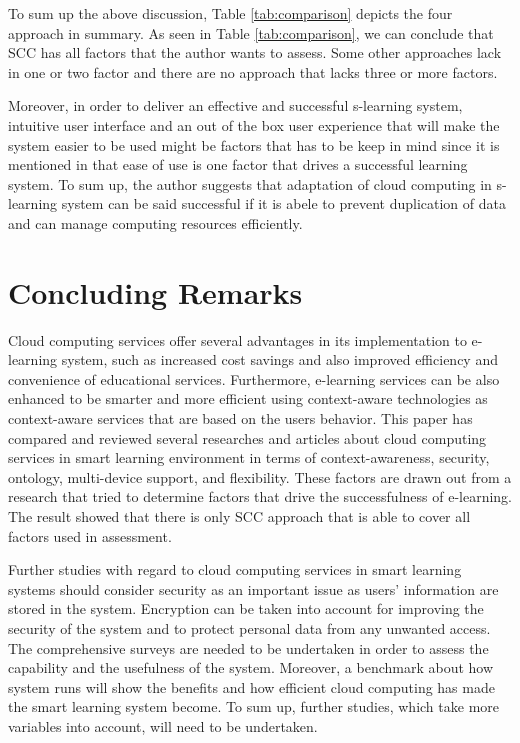 \documentclass[journal]{vgtc}
\begin{document}
To sum up the above discussion, Table \ref{tab:comparison} depicts the four approach in summary. As seen in Table \ref{tab:comparison}, we can conclude that SCC has all factors that the author wants to assess. Some other approaches lack in one or two factor and there are no approach that lacks three or more factors.

Moreover, in order to deliver an effective and successful s-learning system, intuitive user interface and an out of the box user experience that will make the system easier to be used might be factors that has to be keep in mind since it is mentioned in \cite{Sun2008} that ease of use is one factor that drives a successful learning system. To sum up, the author suggests that adaptation of cloud computing in s-learning system can be said successful if it is abele to prevent duplication of data and can manage computing resources efficiently.

\section{Concluding Remarks}
Cloud computing services offer several advantages in its implementation to e-learning system, such as increased cost savings and also improved efficiency and convenience of educational services. Furthermore, e-learning services can be also enhanced to be smarter and more efficient using context-aware technologies as context-aware services that are based on the users behavior. This paper has compared and reviewed several researches and articles about cloud computing services in smart learning environment in terms of context-awareness, security, ontology, multi-device support, and flexibility. These factors are drawn out from a research that tried to determine factors that drive the successfulness of e-learning. The result showed that there is only SCC approach that is able to cover all factors used in assessment.

Further studies with regard to cloud computing services in smart learning systems should consider security as an important issue as users' information are stored in the system. Encryption can be taken into account for improving the security of the system and to protect personal data from any unwanted access. The comprehensive surveys are needed to be undertaken in order to assess the capability and the usefulness of the system. Moreover, a benchmark about how system runs will show the benefits and how efficient cloud computing has made the smart learning system become. To sum up, further studies, which take more variables into account, will need to be undertaken.




\end{document}
